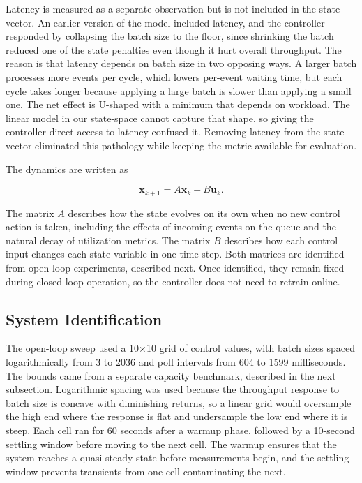 \documentclass[10pt,a4paper]{article}
\begin{document}
Latency is measured as a separate observation but is not included in the state vector. An earlier version of the model included latency, and the controller responded by collapsing the batch size to the floor, since shrinking the batch reduced one of the state penalties even though it hurt overall throughput. The reason is that latency depends on batch size in two opposing ways. A larger batch processes more events per cycle, which lowers per-event waiting time, but each cycle takes longer because applying a large batch is slower than applying a small one. The net effect is U-shaped with a minimum that depends on workload. The linear model in our state-space cannot capture that shape, so giving the controller direct access to latency confused it. Removing latency from the state vector eliminated this pathology while keeping the metric available for evaluation.

The dynamics are written as

\begin{equation}
\mathbf{x}_{k+1} = A \mathbf{x}_k + B \mathbf{u}_k.
\end{equation}

The matrix $A$ describes how the state evolves on its own when no new control action is taken, including the effects of incoming events on the queue and the natural decay of utilization metrics. The matrix $B$ describes how each control input changes each state variable in one time step. Both matrices are identified from open-loop experiments, described next. Once identified, they remain fixed during closed-loop operation, so the controller does not need to retrain online.

\subsection{System Identification}

The open-loop sweep used a 10$\times$10 grid of control values, with batch sizes spaced logarithmically from 3 to 2036 and poll intervals from 604 to 1599 milliseconds. The bounds came from a separate capacity benchmark, described in the next subsection. Logarithmic spacing was used because the throughput response to batch size is concave with diminishing returns, so a linear grid would oversample the high end where the response is flat and undersample the low end where it is steep. Each cell ran for 60 seconds after a warmup phase, followed by a 10-second settling window before moving to the next cell. The warmup ensures that the system reaches a quasi-steady state before measurements begin, and the settling window prevents transients from one cell contaminating the next.
\end{document}
